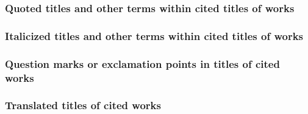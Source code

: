 \documentclass[11pt,letterpaper,oneside]{article}
\begin{document}
\begin{citebib}
\item \cite{beiser2014}
\end{citebib}

\subsubsection{Quoted titles and other terms within cited titles of works}

\begin{citebib}
\item \cite{levitt2014}
\item \cite{mchugh1980}
\end{citebib}

\subsubsection{Italicized titles and other terms within cited titles of works}

\begin{citebib}
\item \cite{vanwagenen1973}
\end{citebib}

\subsubsection{Question marks or exclamation points in titles of cited works}

\begin{citebib}
\item \cite[63]{berra2002}
\item \cite[183]{oram2007}
\item \cite[778]{tessler2014}
\item \cite[336]{batson1990}
\item \cite[55--56]{berra2002}
\item \cite[184]{oram2007}
\item \cite[780]{tessler2014}
\item \cite[337]{batson1990}
\end{citebib}

\setcounter{subsubsection}{98}
\subsubsection{Translated titles of cited works}
\end{document}
